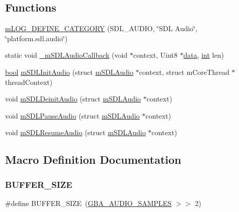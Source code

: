 \subsection*{Functions}
\begin{DoxyCompactItemize}
\item 
\mbox{\hyperlink{sdl-audio_8c_a0cb1f00b3f80d1efe5dd621df6aa101e}{m\+L\+O\+G\+\_\+\+D\+E\+F\+I\+N\+E\+\_\+\+C\+A\+T\+E\+G\+O\+RY}} (S\+D\+L\+\_\+\+A\+U\+D\+IO, \char`\"{}S\+DL Audio\char`\"{}, \char`\"{}platform.\+sdl.\+audio\char`\"{})
\item 
static void \mbox{\hyperlink{sdl-audio_8c_a1ab36538916d6aebaea28162cb4e35a4}{\+\_\+m\+S\+D\+L\+Audio\+Callback}} (void $\ast$context, Uint8 $\ast$\mbox{\hyperlink{libretro_8c_a735984d41155bc1032e09bece8f8d66d}{data}}, \mbox{\hyperlink{ioapi_8h_a787fa3cf048117ba7123753c1e74fcd6}{int}} len)
\item 
\mbox{\hyperlink{libretro_8h_a4a26dcae73fb7e1528214a068aca317e}{bool}} \mbox{\hyperlink{sdl-audio_8c_aa58bb1fe9aa1e3a8eaac9b81fdb4c5b6}{m\+S\+D\+L\+Init\+Audio}} (struct \mbox{\hyperlink{sdl-audio_8h_structm_s_d_l_audio}{m\+S\+D\+L\+Audio}} $\ast$context, struct m\+Core\+Thread $\ast$thread\+Context)
\item 
void \mbox{\hyperlink{sdl-audio_8c_adadf9e93127f15bd0b8f6910f1b64628}{m\+S\+D\+L\+Deinit\+Audio}} (struct \mbox{\hyperlink{sdl-audio_8h_structm_s_d_l_audio}{m\+S\+D\+L\+Audio}} $\ast$context)
\item 
void \mbox{\hyperlink{sdl-audio_8c_a6fd4770ab1d4825f5f3231ce155d4696}{m\+S\+D\+L\+Pause\+Audio}} (struct \mbox{\hyperlink{sdl-audio_8h_structm_s_d_l_audio}{m\+S\+D\+L\+Audio}} $\ast$context)
\item 
void \mbox{\hyperlink{sdl-audio_8c_aec2e6fbd9b73db60bf1dee6113caeb03}{m\+S\+D\+L\+Resume\+Audio}} (struct \mbox{\hyperlink{sdl-audio_8h_structm_s_d_l_audio}{m\+S\+D\+L\+Audio}} $\ast$context)
\end{DoxyCompactItemize}


\subsection{Macro Definition Documentation}
\mbox{\label{sdl-audio_8c_a6b20d41d6252e9871430c242cb1a56e7}} 
\subsubsection{\texorpdfstring{B\+U\+F\+F\+E\+R\+\_\+\+S\+I\+ZE}{BUFFER\_SIZE}}
{\footnotesize\ttfamily \#define B\+U\+F\+F\+E\+R\+\_\+\+S\+I\+ZE~(\mbox{\hyperlink{_2audio_8c_a422895065f1256e720e761567d0b443e}{G\+B\+A\+\_\+\+A\+U\+D\+I\+O\+\_\+\+S\+A\+M\+P\+L\+ES}} $>$$>$ 2)}



